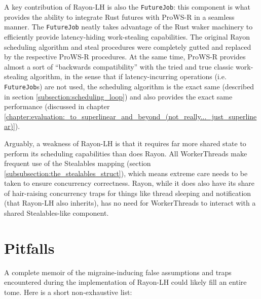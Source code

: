 \documentclass[bsc,frontabs,singlespacing,parskip,deptreport,normalheadings]{infthesis}
\begin{document}
A key contribution of Rayon-LH is also the \texttt{FutureJob}: this component is
what provides the ability to integrate Rust futures with ProWS-R in a seamless
manner. The \texttt{FutureJob} neatly takes advantage of the Rust waker
machinery to efficiently provide latency-hiding work-stealing capabilities. The
original Rayon scheduling algorithm and steal procedures were completely gutted
and replaced by the respective ProWS-R procedures. At the same time, ProWS-R
provides almost a sort of ``backwards compatibility'' with the tried and true
classic work-stealing algorithm, in the sense that if latency-incurring
operations (i.e. \texttt{FutureJob}s) are not used, the scheduling algorithm is
the exact same (described in section \ref{subsection:scheduling_loop}) and also
provides the exact same performance (discussed in chapter
\ref{chapter:evaluation:_to_superlinear_and_beyond_(not_really..._just_superlinear)}).

Arguably, a weakness of Rayon-LH is that it requires far more shared state to
perform its scheduling capabilities than does Rayon. All WorkerThreads make
frequent use of the Stealables mapping (section
\ref{subsubsection:the_stealables_struct}), which means extreme care needs to be
taken to ensure concurrency correctness. Rayon, while it does also have
its share of hair-raising concurrency traps for things like thread sleeping and
notification (that Rayon-LH also inherits), has no need for WorkerThreads to
interact with a shared Stealables-like component.

\section{Pitfalls}
\label{section:pitfalls}

A complete memoir of the migraine-inducing false assumptions and traps
encountered during the implementation of Rayon-LH could likely fill an entire
tome. Here is a short non-exhaustive list:
\end{document}
